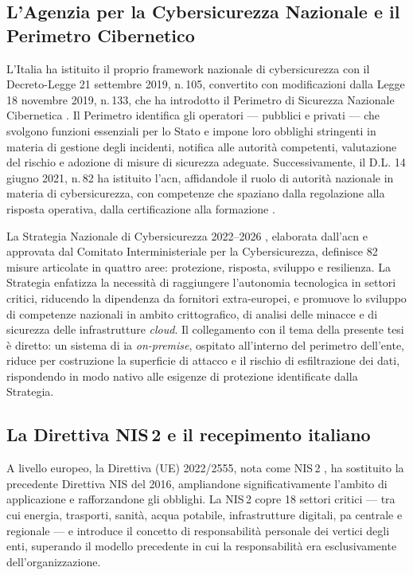\subsection{L'Agenzia per la Cybersicurezza Nazionale e il Perimetro Cibernetico}

L'Italia ha istituito il proprio framework nazionale di cybersicurezza con il Decreto-Legge 21 settembre 2019, n.\,105, convertito con modificazioni dalla Legge 18 novembre 2019, n.\,133, che ha introdotto il Perimetro di Sicurezza Nazionale Cibernetica \parencite{PerimetroCibernetico}. Il Perimetro identifica gli operatori --- pubblici e privati --- che svolgono funzioni essenziali per lo Stato e impone loro obblighi stringenti in materia di gestione degli incidenti, notifica alle autorità competenti, valutazione del rischio e adozione di misure di sicurezza adeguate. Successivamente, il D.L. 14 giugno 2021, n.\,82 ha istituito l'\gls{acn}, affidandole il ruolo di autorità nazionale in materia di cybersicurezza, con competenze che spaziano dalla regolazione alla risposta operativa, dalla certificazione alla formazione \parencite{ACN2022}.

La Strategia Nazionale di Cybersicurezza 2022--2026 \parencite{ACN2022}, elaborata dall'\gls{acn} e approvata dal Comitato Interministeriale per la Cybersicurezza, definisce 82 misure articolate in quattro aree: protezione, risposta, sviluppo e resilienza. La Strategia enfatizza la necessità di raggiungere l'autonomia tecnologica in settori critici, riducendo la dipendenza da fornitori extra-europei, e promuove lo sviluppo di competenze nazionali in ambito crittografico, di analisi delle minacce e di sicurezza delle infrastrutture \textit{cloud}. Il collegamento con il tema della presente tesi è diretto: un sistema di \gls{ia} \textit{on-premise}, ospitato all'interno del perimetro dell'ente, riduce per costruzione la superficie di attacco e il rischio di esfiltrazione dei dati, rispondendo in modo nativo alle esigenze di protezione identificate dalla Strategia.

\subsection{La Direttiva \texorpdfstring{NIS\,2}{NIS 2} e il recepimento italiano}

A livello europeo, la Direttiva (UE) 2022/2555, nota come NIS\,2 \parencite{NIS2Directive}, ha sostituito la precedente Direttiva NIS del 2016, ampliandone significativamente l'ambito di applicazione e rafforzandone gli obblighi. La NIS\,2 copre 18 settori critici --- tra cui energia, trasporti, sanità, acqua potabile, infrastrutture digitali, \gls{pa} centrale e regionale --- e introduce il concetto di responsabilità personale dei vertici degli enti, superando il modello precedente in cui la responsabilità era esclusivamente dell'organizzazione.

